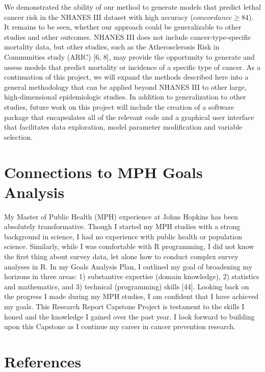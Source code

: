 \documentclass[12pt,oneside]{reedthesis}
\theoremstyle{definition}
\theoremstyle{definition}
\theoremstyle{definition}
\theoremstyle{remark}
\begin{document}
We demonstrated the ability of our method to generate models that
predict lethal cancer risk in the NHANES III dataset with high accuracy
(\(concordance \geq 84\)). It remains to be seen, whether our approach
could be generalizable to other studies and other outcomes. NHANES III
does not include cancer-type-specific mortality data, but other studies,
such as the Atherosclerosis Risk in Communities study (ARIC) {[}6, 8{]},
may provide the opportunity to generate and assess models that predict
mortality or incidence of a specific type of cancer. As a continuation
of this project, we will expand the methods described here into a
general methodology that can be applied beyond NHANES III to other
large, high-dimensional epidemiologic studies. In addition to
generalization to other studies, future work on this project will
include the creation of a software package that encapsulates all of the
relevant code and a graphical user interface that facilitates data
exploration, model parameter modification and variable selection.

\hypertarget{connections-to-mph-goals-analysis}{%
\section*{Connections to MPH Goals
Analysis}\label{connections-to-mph-goals-analysis}}

My Master of Public Health (MPH) experience at Johns Hopkins has been
absolutely transformative. Though I started my MPH studies with a strong
background in science, I had no experience with public health or
population science. Similarly, while I was comfortable with R
programming, I did not know the first thing about survey data, let alone
how to conduct complex survey analyses in R. In my Goals Analysis Plan,
I outlined my goal of broadening my horizons in three areas: 1)
substantive expertise (domain knowledge), 2) statistics and mathematics,
and 3) technical (programming) skills {[}44{]}. Looking back on the
progress I made during my MPH studies, I am confident that I have
achieved my goals. This Research Report Capstone Project is testament to
the skills I honed and the knowledge I gained over the past year. I look
forward to building upon this Capstone as I continue my career in cancer
prevention research.

\hypertarget{references}{%
\section*{References}\label{references}}
\end{document}
